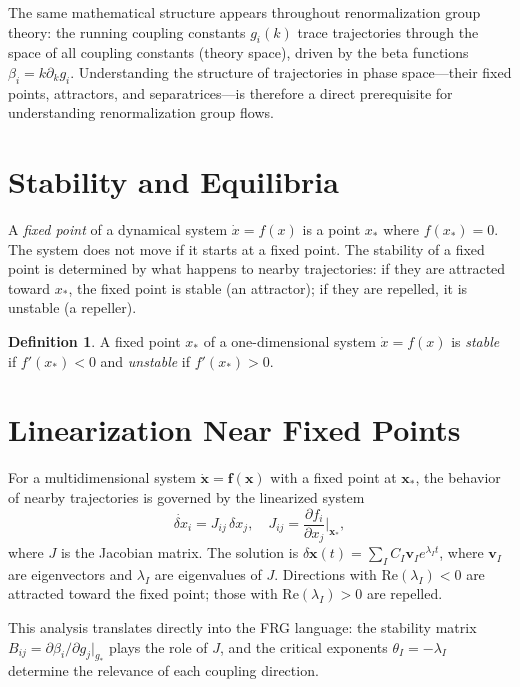 \documentclass[12pt,a4paper,oneside]{book}
\theoremstyle{definition}
\newtheorem{definition}{Definition}[chapter]
\theoremstyle{plain}
\theoremstyle{remark}
\begin{document}
The same mathematical structure appears throughout renormalization group theory:
the running coupling constants $g_i(k)$ trace trajectories through the space
of all coupling constants (theory space), driven by the beta functions
$\beta_i = k\partial_k g_i$. Understanding the structure of trajectories in
phase space---their fixed points, attractors, and separatrices---is therefore
a direct prerequisite for understanding renormalization group flows.

\section{Stability and Equilibria}

A \emph{fixed point} of a dynamical system $\dot x = f(x)$ is a point $x_*$
where $f(x_*) = 0$. The system does not move if it starts at a fixed point.
The stability of a fixed point is determined by what happens to nearby
trajectories: if they are attracted toward $x_*$, the fixed point is stable
(an attractor); if they are repelled, it is unstable (a repeller).

\begin{definition}
A fixed point $x_*$ of a one-dimensional system $\dot x = f(x)$ is
\emph{stable} if $f'(x_*) < 0$ and \emph{unstable} if $f'(x_*) > 0$.
\end{definition}

\section{Linearization Near Fixed Points}

For a multidimensional system $\dot{\mathbf{x}} = \mathbf{f}(\mathbf{x})$
with a fixed point at $\mathbf{x}_*$, the behavior of nearby trajectories is
governed by the linearized system
\begin{equation}
\dot{\delta x}_i = J_{ij}\,\delta x_j,
\quad
J_{ij} = \frac{\partial f_i}{\partial x_j}\bigg|_{\mathbf{x}_*},
\end{equation}
where $J$ is the Jacobian matrix. The solution is
$\delta \mathbf{x}(t) = \sum_I C_I \mathbf{v}_I e^{\lambda_I t}$,
where $\mathbf{v}_I$ are eigenvectors and $\lambda_I$ are eigenvalues of $J$.
Directions with $\text{Re}(\lambda_I) < 0$ are attracted toward the fixed
point; those with $\text{Re}(\lambda_I) > 0$ are repelled.

This analysis translates directly into the FRG language: the stability matrix
$B_{ij} = \partial\beta_i/\partial g_j|_{g_*}$ plays the role of $J$, and the
critical exponents $\theta_I = -\lambda_I$ determine the relevance of each
coupling direction.
\end{document}
